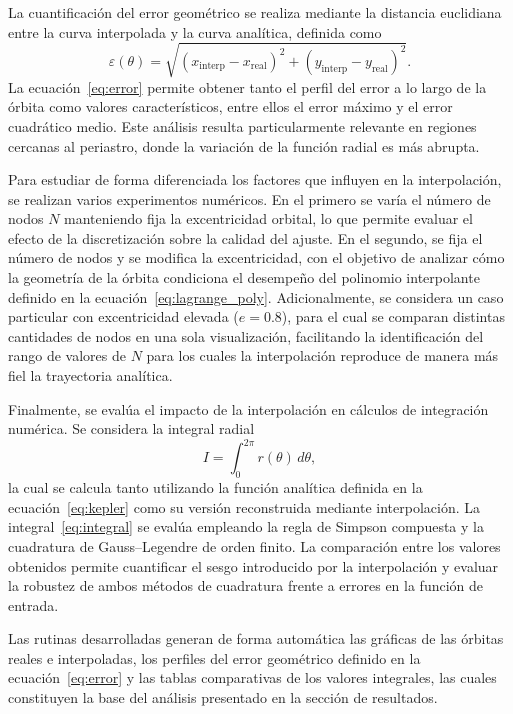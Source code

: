 \documentclass[reprint,amsmath,amssymb,aps]{revtex4-2}
\begin{document}
	La cuantificación del error geométrico se realiza mediante la distancia euclidiana entre la curva interpolada y la curva analítica, definida como
	\begin{equation}
		\varepsilon(\theta)=\sqrt{
			\left(x_{\text{interp}}-x_{\text{real}}\right)^2+
			\left(y_{\text{interp}}-y_{\text{real}}\right)^2}.
		\label{eq:error}
	\end{equation}
	La ecuación~\eqref{eq:error} permite obtener tanto el perfil del error a lo largo de la órbita como valores característicos, entre ellos el error máximo y el error cuadrático medio. Este análisis resulta particularmente relevante en regiones cercanas al periastro, donde la variación de la función radial es más abrupta.
	
	Para estudiar de forma diferenciada los factores que influyen en la interpolación, se realizan varios experimentos numéricos. En el primero se varía el número de nodos $N$ manteniendo fija la excentricidad orbital, lo que permite evaluar el efecto de la discretización sobre la calidad del ajuste. En el segundo, se fija el número de nodos y se modifica la excentricidad, con el objetivo de analizar cómo la geometría de la órbita condiciona el desempeño del polinomio interpolante definido en la ecuación~\eqref{eq:lagrange_poly}. Adicionalmente, se considera un caso particular con excentricidad elevada ($e=0.8$), para el cual se comparan distintas cantidades de nodos en una sola visualización, facilitando la identificación del rango de valores de $N$ para los cuales la interpolación reproduce de manera más fiel la trayectoria analítica.
	
	Finalmente, se evalúa el impacto de la interpolación en cálculos de integración numérica. Se considera la integral radial
	\begin{equation}
		I=\int_{0}^{2\pi} r(\theta)\,d\theta,
		\label{eq:integral}
	\end{equation}
	la cual se calcula tanto utilizando la función analítica definida en la ecuación~\eqref{eq:kepler} como su versión reconstruida mediante interpolación. La integral~\eqref{eq:integral} se evalúa empleando la regla de Simpson compuesta y la cuadratura de Gauss--Legendre de orden finito. La comparación entre los valores obtenidos permite cuantificar el sesgo introducido por la interpolación y evaluar la robustez de ambos métodos de cuadratura frente a errores en la función de entrada.
	
	Las rutinas desarrolladas generan de forma automática las gráficas de las órbitas reales e interpoladas, los perfiles del error geométrico definido en la ecuación~\eqref{eq:error} y las tablas comparativas de los valores integrales, las cuales constituyen la base del análisis presentado en la sección de resultados.
	
\end{document}
